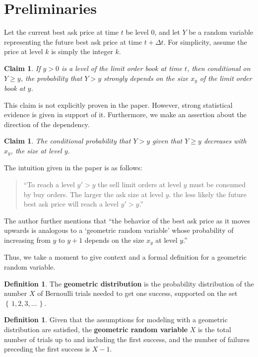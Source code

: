 \documentclass[12pt, reqno]{amsart}
\theoremstyle{definition}
\theoremstyle{definition}
\theoremstyle{plain}
\newtheorem{Claim}[theorem]{Claim}
\theoremstyle{definition}
\newtheorem{Def}[theorem]{Definition}
\theoremstyle{remark}
\renewcommand{\geq}{\geqslant}			%
\renewcommand{\'}{\hspace{0.5mm}'}			%
\renewcommand{\Set}[1]{\left\{\,#1\,\right\}}	%
\begin{document}
\thispagestyle{fancy}

\tableofcontents

\section{Preliminaries}\label{prelim}

Let the current best ask price at time $t$ be level $0$, and let $Y$ be a random variable representing the future best ask price at time $t + \Delta t$. For simplicity, assume the price at level $k$ is simply the integer $k$. 

\begin{Claim}
	If $y > 0$ is a level of the limit order book at time $t$, then conditional on $Y \geq y$, the probability that $Y > y$ strongly depends on the size $x_y$ of the limit order book at $y$. 
\end{Claim}

This claim is not explicitly proven in the paper. However, strong statistical evidence is given in support of it. Furthermore, we make an assertion about the direction of the dependency. 

\begin{Claim}
	The conditional probability that $Y > y$ given that $Y \geq y$ decreases with $x_y$, the size at level $y$. 
\end{Claim}

The intuition given in the paper is as follows:
\begin{quote}
	``To reach a level $y' > y$ the sell limit orders at level $y$ must be consumed by buy orders. The larger the ask size at level $y$. the less likely the future best ask price will reach a level $y' > y$.''
\end{quote}

The author further mentions that ``the behavior of the best ask price as it moves upwards is analogous to a `geometric random variable' whose probability of increasing from $y$ to $y + 1$ depends on the size $x_y$ at level $y$.''

Thus, we take a moment to give context and a formal definition for a geometric random variable. 

\begin{Def}
	The \textbf{geometric distribution} is the probability distribution of the number $X$ of Bernoulli trials needed to get one success, supported on the set $\Set{1,2,3,\ldots}$. 
\end{Def}

\begin{Def}
	Given that the assumptions for modeling with a geometric distribution are satisfied, the \textbf{geometric random variable} $X$ is the total number of trials up to and including the first success, and the number of failures preceding the first success is $X - 1$. 
\end{Def}
\end{document}
